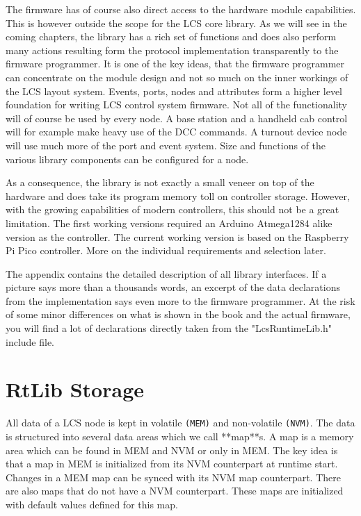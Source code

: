The firmware has of course also direct access to the hardware module capabilities. This is however outside the scope for the LCS core library. As we will see in the coming chapters, the library has a rich set of functions and does also perform many actions resulting form the protocol implementation transparently to the firmware programmer. It is one of the key ideas, that the firmware programmer can concentrate on the module design and not so much on the inner workings of the LCS layout system. Events, ports, nodes and attributes form a higher level foundation for writing LCS control system firmware. Not all of the functionality will of course be used by every node. A base station and a handheld cab control will for example make heavy use of the DCC commands. A turnout device node will use much more of the port and event system. Size and functions of the various library components can be configured for a node.

As a consequence, the library is not exactly a small veneer on top of the hardware and does take its program memory toll on controller storage. However, with the growing capabilities of modern controllers, this should not be a great limitation. The first working versions required an Arduino Atmega1284 alike version as the controller. The current working version is based on the Raspberry Pi Pico controller. More on the individual requirements and selection later.

The appendix contains the detailed description of all library interfaces. If a picture says more than a thousands words, an excerpt of the data declarations from the implementation says even more to the firmware programmer. At the risk of some minor differences on what is shown in the book and the actual firmware, you will find a lot of declarations directly taken from the "LcsRuntimeLib.h" include file.

\chapter{RtLib Storage}

All data of a LCS node is kept in volatile \texttt{(MEM)} and non-volatile \texttt{(NVM)}. The data is structured into several data areas which we call **map**s. A map is a memory area which can be found in MEM and NVM or only in MEM. The key idea is that a map in MEM is initialized from its NVM counterpart at runtime start. Changes in a MEM map can be synced with its NVM map counterpart. There are also maps that do not have a NVM counterpart. These maps are initialized with default values defined for this map. 

